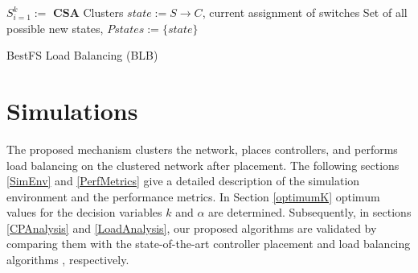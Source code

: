 \documentclass[preprint,12pt]{elsarticle}
\begin{document}
	
	\begin{algorithm}
		\SetAlgoLined
		$S_{i=1}^k := $ \textbf{CSA} Clusters\;
		$state := S \rightarrow C$, current assignment of switches\;
		Set of all possible new states, $Pstates := \{state\}$\;
		\caption{BestFS Load Balancing (BLB)} \label{algo:blb}
	\end{algorithm}
	
	\section{Simulations} \label{simulations}
	
	The proposed mechanism clusters the network, places controllers, and performs load balancing on the clustered network after placement. The following sections \ref{SimEnv} and \ref{PerfMetrics} give a detailed description of the simulation environment and the performance metrics. In Section \ref{optimumK} optimum values for the decision variables $k$ and $\alpha$ are determined. Subsequently, in sections \ref{CPAnalysis} and \ref{LoadAnalysis}, our proposed algorithms are validated by comparing them with the state-of-the-art controller placement \cite{dbcp2017} and load balancing algorithms \cite{filali2018sdn}, respectively.
	
\end{document}
